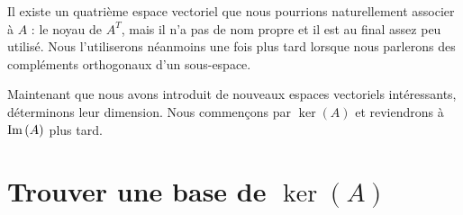 Il existe un quatrième espace vectoriel que nous pourrions naturellement associer à $A$ : le noyau de $A^T$, mais il n'a pas de nom propre et il est au final assez peu utilisé. Nous l'utiliserons néanmoins une fois plus tard lorsque nous parlerons des compléments orthogonaux d'un sous-espace.


Maintenant que nous avons introduit de nouveaux espaces vectoriels intéressants, déterminons
leur dimension.  Nous commençons par $\ker(A)$ et reviendrons à $\operatorname{Im}\,(A)$ plus tard. 

\section{Trouver une base de $\ker(A)$}  \mbox{}

